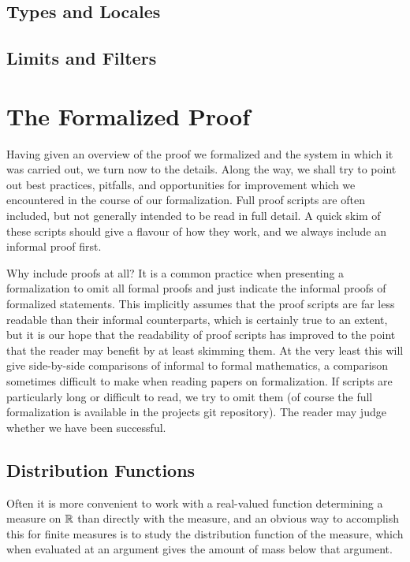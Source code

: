 \documentclass{article}
\theoremstyle{definition}
\begin{document}
\subsection{Types and Locales} \label{sec:loc}

\subsection{Limits and Filters} \label{sec:filterlim}

\section{The Formalized Proof} \label{sec:form}

Having given an overview of the proof we formalized and the system in which it was carried out, we turn now to the details. Along the way, we shall try to point out best practices, pitfalls, and opportunities for improvement which we encountered in the course of our formalization. Full proof scripts are often included, but not generally intended to be read in full detail. A quick skim of these scripts should give a flavour of how they work, and we always include an informal proof first.

Why include proofs at all? It is a common practice when presenting a formalization to omit all formal proofs and just indicate the informal proofs of formalized statements. This implicitly assumes that the proof scripts are far less readable than their informal counterparts, which is certainly true to an extent, but it is our hope that the readability of proof scripts has improved to the point that the reader may benefit by at least skimming them. At the very least this will give side-by-side comparisons of informal to formal mathematics, a comparison sometimes difficult to make when reading papers on formalization. If scripts are particularly long or difficult to read, we try to omit them (of course the full formalization is available in the projects git repository). The reader may judge whether we have been successful.

\subsection{Distribution Functions} \label{sec:cdf}

Often it is more convenient to work with a real-valued function determining a measure on $\mathbb{R}$ than directly with the measure, and an obvious way to accomplish this for finite measures is to study the distribution function of the measure, which when evaluated at an argument gives the amount of mass below that argument.
\end{document}
